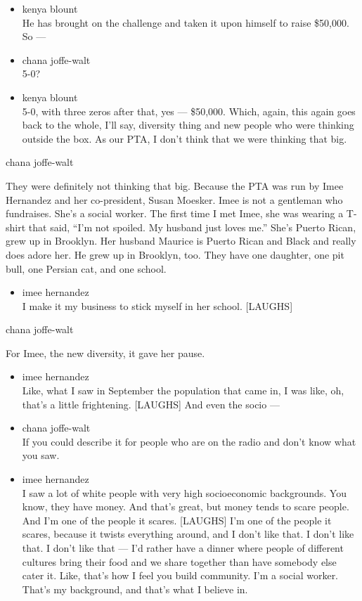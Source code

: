 \begin{itemize}
\item
  kenya blount\\
  He has brought on the challenge and taken it upon himself to raise
  \$50,000. So ---
\item
  chana joffe-walt\\
  5-0?
\item
  kenya blount\\
  5-0, with three zeros after that, yes --- \$50,000. Which, again, this
  again goes back to the whole, I'll say, diversity thing and new people
  who were thinking outside the box. As our PTA, I don't think that we
  were thinking that big.
\end{itemize}

chana joffe-walt

They were definitely not thinking that big. Because the PTA was run by
Imee Hernandez and her co-president, Susan Moesker. Imee is not a
gentleman who fundraises. She's a social worker. The first time I met
Imee, she was wearing a T-shirt that said, ``I'm not spoiled. My husband
just loves me.'' She's Puerto Rican, grew up in Brooklyn. Her husband
Maurice is Puerto Rican and Black and really does adore her. He grew up
in Brooklyn, too. They have one daughter, one pit bull, one Persian cat,
and one school.

\begin{itemize}
\tightlist
\item
  imee hernandez\\
  I make it my business to stick myself in her school. {[}LAUGHS{]}
\end{itemize}

chana joffe-walt

For Imee, the new diversity, it gave her pause.

\begin{itemize}
\item
  imee hernandez\\
  Like, what I saw in September the population that came in, I was like,
  oh, that's a little frightening. {[}LAUGHS{]} And even the socio ---
\item
  chana joffe-walt\\
  If you could describe it for people who are on the radio and don't
  know what you saw.
\item
  imee hernandez\\
  I saw a lot of white people with very high socioeconomic backgrounds.
  You know, they have money. And that's great, but money tends to scare
  people. And I'm one of the people it scares. {[}LAUGHS{]} I'm one of
  the people it scares, because it twists everything around, and I don't
  like that. I don't like that. I don't like that --- I'd rather have a
  dinner where people of different cultures bring their food and we
  share together than have somebody else cater it. Like, that's how I
  feel you build community. I'm a social worker. That's my background,
  and that's what I believe in.
\end{itemize}


